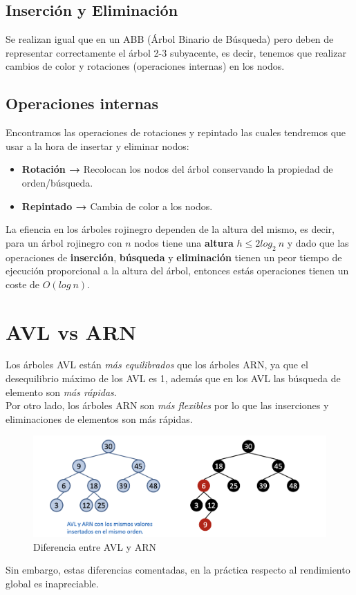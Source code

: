 \subsection*{Inserción y Eliminación}
Se realizan igual que en un ABB (Árbol Binario de Búsqueda) pero deben de representar correctamente el árbol 2-3 subyacente, es decir, tenemos que realizar cambios de color y rotaciones (operaciones internas) en los nodos.
\subsection*{Operaciones internas}
Encontramos las operaciones de rotaciones y repintado las cuales tendremos que usar a la hora de insertar y eliminar nodos:
\begin{itemize}
  \item \textbf{Rotación →} Recolocan los nodos del árbol conservando la propiedad de orden/búsqueda.
  \item \textbf{Repintado →} Cambia de color a los nodos.
\end{itemize}

La efiencia en los árboles rojinegro dependen de la altura del mismo, es decir, para un árbol rojinegro con \(n\) nodos tiene una \textbf{altura} \(h \leq 2log_{2}\ n\) y dado que las operaciones de \textbf{inserción}, \textbf{búsqueda} y \textbf{eliminación} tienen un peor tiempo de ejecución proporcional a la altura del árbol, entonces estás operaciones tienen un coste de \(O (log\ n)\).

\section{AVL vs ARN}
Los árboles AVL están \textit{más equilibrados} que los árboles ARN, ya que el desequilibrio máximo de los AVL es 1, además que en los AVL las búsqueda de elemento son \textit{más rápidas}.\\ 
Por otro lado, los árboles ARN son \textit{más flexibles} por lo que las inserciones y eliminaciones de elementos son más rápidas.
\begin{figure}[h]
  \begin{center}
    \includegraphics[width=\textwidth]{assets/avl3.png}
  \end{center}
  \caption{Diferencia entre AVL y ARN}
\end{figure}

Sin embargo, estas diferencias comentadas, en la práctica respecto al rendimiento global es inapreciable.
